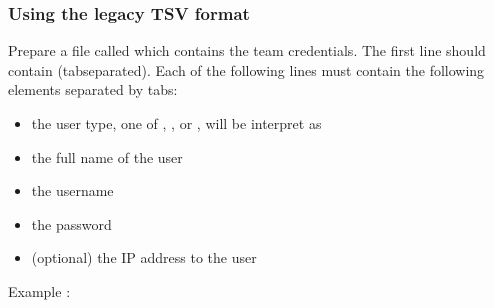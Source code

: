 \documentclass[a4paper,10pt,english,openany]{sphinxmanual}
\begin{document}
\begin{sphinxVerbatim}[commandchars=\\\{\}]
      
\end{sphinxVerbatim}


\subsubsection{Using the legacy TSV format}
\label{\detokenize{import:id3}}
\sphinxAtStartPar
Prepare a file called  which contains the team credentials.
The first line should contain  (tab\sphinxhyphen{}separated).
Each of the following lines must contain the following elements separated by tabs:
\begin{itemize}
\item {} 
\sphinxAtStartPar
the user type, one of , ,  or ,  will be interpret as 

\item {} 
\sphinxAtStartPar
the full name of the user

\item {} 
\sphinxAtStartPar
the username

\item {} 
\sphinxAtStartPar
the password

\item {} 
\sphinxAtStartPar
(optional) the IP address to the user

\end{itemize}

\sphinxAtStartPar
Example :

\begin{sphinxVerbatim}[commandchars=\\\{\}]
     
         
         
                     
\end{sphinxVerbatim}
\end{document}
